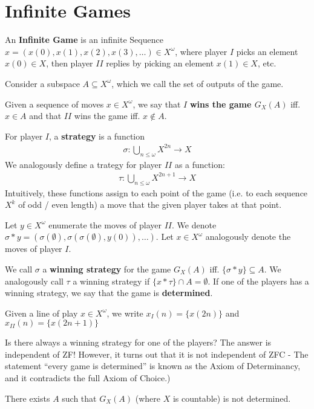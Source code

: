 \documentclass{report}
\newcommand*{\newpar}{\par\vspace{\baselineskip}\noindent}
\newcommand{\tbf}[1]{\textbf{#1}}
\begin{document}
\section{Infinite Games}
An \tbf{Infinite Game} is an infinite Sequence $x = (x(0), x(1), x(2), x(3), \hdots) \in X^\omega$, where player $I$ picks an element $x(0) \in X$, then player $II$ replies by picking an element $x(1) \in X$, etc.
\newpar
Consider a subspace $A \subseteq X^\omega$, which we call the set of outputs of the game.
\newpar
Given a sequence of moves $x \in X^\omega$, we say that $I$ \tbf{wins the game $G_X(A)$} iff. $x \in A$ and that $II$ wins the game iff. $x \notin A$.
\newpar
For player $I$, a \tbf{strategy} is a function 
\begin{align*}
 \sigma : \bigcup_{n \leq \omega} X^{2n} \to X
\end{align*}
We analogously define a trategy for player $II$ as a function:
\begin{align*}
 \tau : \bigcup_{n \leq \omega} X^{2n+1} \to X
\end{align*}
Intuitively, these functions assign to each point of the game (i.e. to each sequence $X^k$ of odd / even length) a move that the given player takes at that point.
\newpar
Let $y \in X^\omega$ enumerate the moves of player $II$. We denote $\sigma * y = (\sigma(\emptyset), \sigma(\sigma(\emptyset), y(0)), \hdots)$. Let $x \in X^\omega$ analogously denote the moves of player $I$.
\newpar
We call $\sigma$ a \tbf{winning strategy} for the game $G_X(A)$ iff. $\{\sigma * y\} \subseteq A$. We analogously call $\tau$ a winning strategy if $\{x * \tau\} \cap A = \emptyset$. If one of the players has a winning strategy, we say that the game is \tbf{determined}.
\newpar
Given a line of play $x \in X^\omega$, we write $x_I(n) = \{x(2n)\}$ and $x_{II}(n) = \{x(2n+1)\}$
\newpar
Is there always a winning strategy for one of the players? The answer is independent of ZF! However, it turns out that it is not independent of ZFC - The statement ``every game is determined'' is known as the Axiom of Determinancy, and it contradicts the full Axiom of Choice.)
\newpar
\begin{theorem}
 There exists $A$ such that $G_X(A)$ (where $X$ is countable) is not determined.
\end{theorem}
\end{document}
